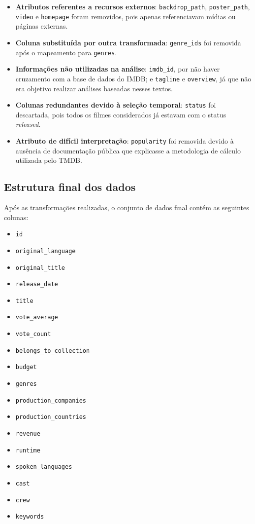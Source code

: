 \begin{itemize}
    \item \textbf{Atributos referentes a recursos externos}: \texttt{backdrop\_path}, \texttt{poster\_path}, \texttt{video} e \texttt{homepage} foram removidos, pois apenas referenciavam mídias ou páginas externas.
    \item \textbf{Coluna substituída por outra transformada}: \texttt{genre\_ids} foi removida após o mapeamento para \texttt{genres}.
    \item \textbf{Informações não utilizadas na análise}: \texttt{imdb\_id}, por não haver cruzamento com a base de dados do \acrshort{IMDB}; e \texttt{tagline} e \texttt{overview}, já que não era objetivo realizar análises baseadas nesses textos.
    \item \textbf{Colunas redundantes devido à seleção temporal}: \texttt{status} foi descartada, pois todos os filmes considerados já estavam com o status \textit{released}.
    \item \textbf{Atributo de difícil interpretação}: \texttt{popularity} foi removida devido à ausência de documentação pública que explicasse a metodologia de cálculo utilizada pelo \acrshort{TMDB}.
\end{itemize}

\subsection{Estrutura final dos dados}
Após as transformações realizadas, o conjunto de dados final contém as seguintes colunas:
\begin{itemize}
    \item \texttt{id}
    \item \texttt{original\_language}
    \item \texttt{original\_title}
    \item \texttt{release\_date}
    \item \texttt{title}
    \item \texttt{vote\_average}
    \item \texttt{vote\_count}
    \item \texttt{belongs\_to\_collection}
    \item \texttt{budget}
    \item \texttt{genres}
    \item \texttt{production\_companies}
    \item \texttt{production\_countries}
    \item \texttt{revenue}
    \item \texttt{runtime}
    \item \texttt{spoken\_languages}
    \item \texttt{cast}
    \item \texttt{crew}
    \item \texttt{keywords}
\end{itemize}

